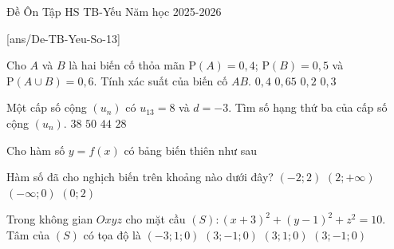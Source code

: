 \begin{name}
{Đề Ôn Tập HS TB-Yếu}
{Năm học 2025-2026}
\end{name}

[ans/De-TB-Yeu-So-13]
\TN
\begin{ex}
	Cho $A$ và $B$ là hai biến cố thỏa mãn $\mathrm{P}(A)=0{,}4$; $\mathrm{P}(B)=0{,}5$ và $\mathrm{P}(A\cup B)=0{,}6$. Tính xác suất của biến cố $AB$.
	\choice
		{$0{,}4$}
		{$0{,}65$}
		{$0{,}2$}
		{\True$0{,}3$}
\end{ex}

\begin{ex}
	Một cấp số cộng $(u_n)$ có $u_{13}=8$ và $d=-3$. Tìm số hạng thứ ba của cấp số cộng $(u_n)$.
	\choice
		{\True$38$}
		{$50$}
		{$44$}
		{$28$}
\end{ex}

\begin{ex}
	Cho hàm số $y=f(x)$ có bảng biến thiên như sau
	\begin{center}
	\end{center}
	Hàm số đã cho nghịch biến trên khoảng nào dưới đây?
	\choice
		{$(-2;2)$}
		{$(2;+\infty)$}
		{$(-\infty;0)$}
		{\True$(0;2)$}
\end{ex}

\begin{ex}
	Trong không gian $Oxyz$ cho mặt cầu $(S):(x+3)^2+(y-1)^2+z^2=10$. Tâm của $(S)$ có tọa độ là
	\choice
		{\True$(-3;1;0)$}
		{$(3;-1;0)$}
		{$(3;1;0)$}
		{$(3;-1;0)$}
\end{ex}


